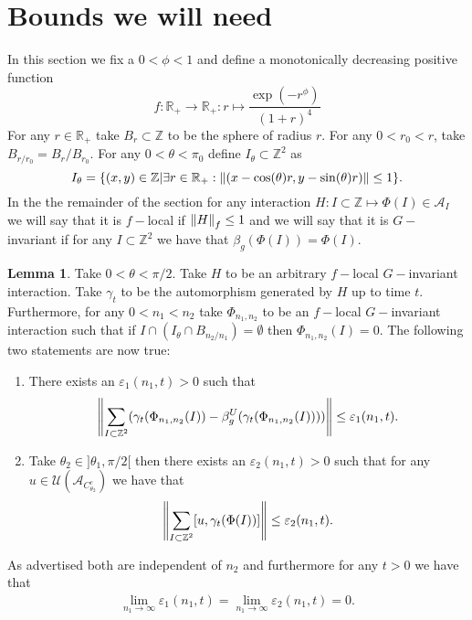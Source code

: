 \documentclass[12pt,a4paper,twoside]{article}
\newcommand{\UU}{\mathcal U}
\newcommand{\ZZ}{\mathbb Z}
\renewcommand{\AA}{\mathcal A}
\newcommand{\RR}{\mathbb R}
\theoremstyle{definition}
\newtheorem{lemma}[theorem]{Lemma}
\numberwithin{equation}{section}
\begin{document}
\section{Bounds we will need}
In this section we fix a $0<\phi<1$ and define a monotonically decreasing positive function
\begin{equation}
	f:\RR_+\rightarrow \RR_+:r\mapsto \frac{\exp(-r^{\phi})}{(1+r)^{4}}
\end{equation}
For any $r\in\RR_+$ take $B_r\subset\ZZ$ to be the sphere of radius $r$. For any $0<r_0<r$, take $B_{r/r_0}=B_{r}/B_{r_0}$. For any $0<\theta<\pi_0$ define $I_{\theta}\subset \ZZ^2$ as
\begin{equation}
	I_{\theta}=\{(x,y)\in\ZZ|\exists r\in\RR_+:\norm{(x-\cos(\theta)r,y-\sin(\theta)r)}\leq 1\}.
\end{equation}
In the the remainder of the section for any interaction $H:I\subset\ZZ\mapsto \Phi(I)\in \AA_I$ we will say that it is $f-$local if $\norm{H}_f\leq 1$ and we will say that it is $G-$invariant if for any $I\subset \ZZ^{2}$ we have that $\beta_g(\Phi(I))=\Phi(I).$
\begin{lemma}\label{lem:Bound1}
	Take $0<\theta<\pi/2$. Take $H$ to be an arbitrary $f-$local $G-$invariant interaction. Take $\gamma_t$ to be the automorphism generated by $H$ up to time $t$. Furthermore, for any $0<n_1<n_2$ take $\Phi_{n_1,n_2}$ to be an $f-$local $G-$invariant interaction such that if $I\cap (I_\theta\cap B_{n_2/n_1})=\emptyset$ then $\Phi_{n_1,n_2}(I)=0$. The following two statements are now true:
	\begin{enumerate}
		\item There exists an $\varepsilon_{1}(n_1,t)>0$ such that
		\begin{equation}
			\norm{\sum_{I\subset \ZZ^2}(\gamma_t(\Phi_{n_1,n_2}(I))-\beta_g^U(\gamma_t(\Phi_{n_1,n_2}(I))))}\leq \varepsilon_{1}(n_1,t).
		\end{equation}
		\item Take $\theta_2\in]\theta_1,\pi/2[$ then there exists an $\varepsilon_{2}(n_1,t)>0$ such that for any $u\in\UU(\AA_{C_{\theta_2}^c})$ we have that
		\begin{equation}
			\norm{\sum_{I\subset \ZZ^2}[u,\gamma_t(\Phi(I))]}\leq \varepsilon_2(n_1,t).
		\end{equation}
	\end{enumerate}
	As advertised both are independent of $n_2$ and furthermore for any $t>0$ we have that
	\begin{align}
		\lim_{n_1\rightarrow\infty}\varepsilon_{1}(n_1,t)=\lim_{n_1\rightarrow\infty}\varepsilon_{2}(n_1,t)=0.
	\end{align}
\end{lemma}
\end{document}
